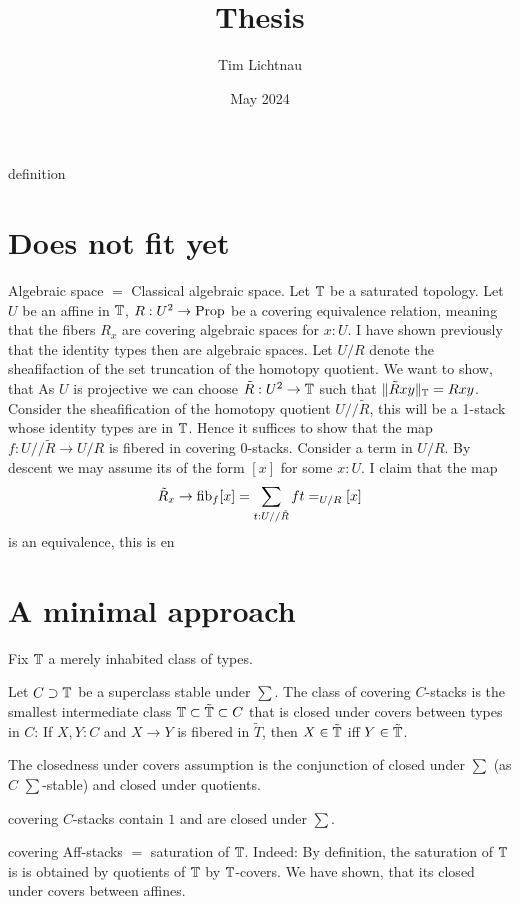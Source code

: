 \documentclass{article}
\title{Thesis}
\author{Tim Lichtnau }
\date{May 2024}
\begin{document}
\newtheorem*{warning}{Warning}{definition}
\maketitle
\section{Does not fit yet}
Algebraic space $=$ Classical algebraic space.
Let $\mathbb{T}$ be a saturated topology.
Let $U$ be an affine in $\mathbb{T}$, $R : U^2 \to \operatorname{Prop}$ be a covering equivalence relation, meaning that the fibers $R_x$ are covering algebraic spaces for $x : U$. I have shown previously that the identity types then are algebraic spaces. Let $U / R$ denote the sheafifaction of the set truncation of the homotopy quotient. We want to show, that  As $U$ is projective we can choose $\tilde R : U^2 \to \mathbb{T}$ such that $\| \tilde R x y \|_{\mathbb{T}}= R x y$. Consider the sheafification of the homotopy quotient $U // \tilde R$, this will be a 1-stack whose identity types are in $\mathbb{T}$. Hence it suffices to show that the map $f : U // \tilde R \to U / R$ is fibered in covering 0-stacks. Consider a term in $U / R$. By descent we may assume its of the form $[x]$ for some $x : U$. I claim that the map \[\tilde R_x \to \operatorname{fib}_f [x] = \sum_{t: U // \tilde R} f t =_{U/R} [x]\]
is an equivalence, this is en
\section{A minimal approach}
Fix $\mathbb{T}$ a merely inhabited class of types.
\begin{definition}
	Let $C \supset \mathbb{T}$ be a superclass stable under $\sum$. The class of covering $C$-stacks is the smallest intermediate class $\mathbb{T} \subset \tilde {\mathbb{T}} \subset C$ that is closed under covers between types in $C$: If $X , Y : C$ and $X \to Y$ is fibered in $\tilde T$, then $X \in \tilde {\mathbb{T}}$ iff $Y \in \tilde {\mathbb{T}}$.
\end{definition}
The closedness under covers assumption is the conjunction of closed under $\sum$ (as $C$ $\sum$-stable) and closed under quotients. \\
\begin{lemma}
	covering $C$-stacks contain $1$ and are closed under $\sum$.
\end{lemma}


\begin{example}
	covering Aff-stacks $=$ saturation of $\mathbb{T}$. Indeed: By definition, the saturation of $\mathbb{T}$ is is obtained by quotients of $\mathbb{T}$ by $\mathbb{T}$-covers. We have shown, that its closed under covers between affines.
\end{example}
\end{document}
